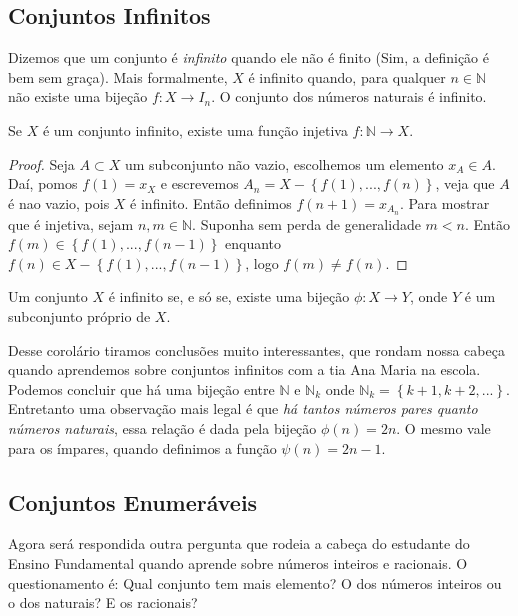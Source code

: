\subsection{Conjuntos Infinitos}
Dizemos que um conjunto é \textit{infinito} quando ele não é finito (Sim, a definição é bem sem graça). Mais formalmente, $X$ é infinito quando, para qualquer $n \in \mathbb{N}$ não existe uma bijeção $f:X \rightarrow I_{n}$. O conjunto dos números naturais é infinito.

\begin{theorem}
Se $X$ é um conjunto infinito, existe uma função injetiva $f: \mathbb{N} \rightarrow X$.
\end{theorem}

\begin{proof}
Seja $A \subset X$ um subconjunto não vazio, escolhemos um elemento $x_{A} \in A$. Daí, pomos $f(1)=x_{X}$ e escrevemos $A_{n}=X-\left \{ f(1),...,f(n) \right \}$, veja que $A$ é nao vazio, pois $X$ é infinito. Então definimos $f(n+1)=x_{A_{n}}$. Para mostrar que é injetiva, sejam $n,m \in \mathbb{N}$. Suponha sem perda de generalidade $m < n$. Então $f(m) \in \left \{ f(1),...,f(n-1) \right \}$ enquanto $f(n) \in X-\left \{ f(1),...,f(n-1) \right \} $, logo $f(m) \neq f(n).$
\end{proof}

\begin{corol}
Um conjunto $X$ é infinito se, e só se, existe uma bijeção $\phi: X \rightarrow Y$, onde $Y$ é um subconjunto próprio de $X$.
\end{corol}

Desse corolário tiramos conclusões muito interessantes, que rondam nossa cabeça quando aprendemos sobre conjuntos infinitos com a tia Ana Maria na escola. Podemos concluir que há uma bijeção entre $\mathbb{N}$ e $\mathbb{N}_{k}$ onde $\mathbb{N}_{k}=\left \{k+1,k+2,... \right \}$. Entretanto uma observação mais legal é que \textit{há tantos números pares quanto números naturais}, essa relação é dada pela bijeção $\phi(n)=2n$. O mesmo vale para os ímpares, quando definimos a função $\psi(n)=2n-1$.

\subsection{Conjuntos Enumeráveis}
Agora será respondida outra pergunta que rodeia a cabeça do estudante do Ensino Fundamental quando aprende sobre números inteiros e racionais. O questionamento é: Qual conjunto tem mais elemento? O dos números inteiros ou o dos naturais? E os racionais?

